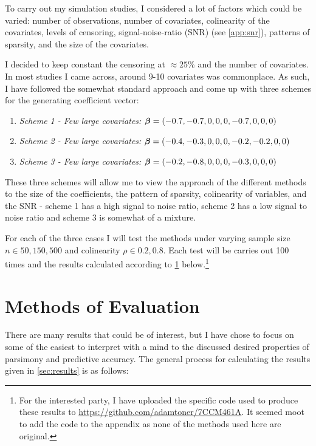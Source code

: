 To carry out my simulation studies, I considered a lot of factors which could be varied: number of observations, number of covariates, colinearity of the covariates, levels of censoring, signal-noise-ratio (SNR) (see \cref{app:snr}), patterns of sparsity, and the size of the covariates.

I decided to keep constant the censoring at $\approx25\%$ and the number of covariates. In most studies I came across, around 9-10 covariates was commonplace. As such, I have followed the somewhat standard approach and come up with three schemes for the generating coefficient vector:

\begin{enumerate}
    \item \emph{Scheme 1 - Few large covariates:} $\boldsymbol{\beta} = (-0.7,-0.7,0,0,0,-0.7,0,0,0)$ 
    \item \emph{Scheme 2 - Few large covariates:} $\boldsymbol{\beta} = (-0.4,-0.3,0,0,0,-0.2,-0.2,0,0)$ 
    \item \emph{Scheme 3 - Few large covariates:} $\boldsymbol{\beta} = (-0.2,-0.8,0,0,0,-0.3,0,0,0)$ 
\end{enumerate}

These three schemes will allow me to view the approach of the different methods to the size of the coefficients, the pattern of sparsity, colinearity of variables, and the SNR - scheme 1 has a high signal to noise ratio, scheme 2 has a low signal to noise ratio and scheme 3 is somewhat of a mixture.

For each of the three cases I will test the methods under varying sample size $n\in{50,150,500}$ and colinearity $\rho\in{0.2,0.8}$. Each test will be carries out 100 times and the results calculated according to \cref{sec:methods} below.\footnote{For the interested party, I have uploaded the specific code used to produce these results to \href{https://github.com/adamtoner/7CCM461A}{https://github.com/adamtoner/7CCM461A}. It seemed moot to add the code to the appendix as none of the methods used here are original.}

\section{Methods of Evaluation}\label{sec:methods}

There are many results that could be of interest, but I have chose to focus on some of the easiest to interpret with a mind to the discussed desired properties of parsimony and predictive accuracy. The general process for calculating the results given in \cref{sec:results} is as follows:

